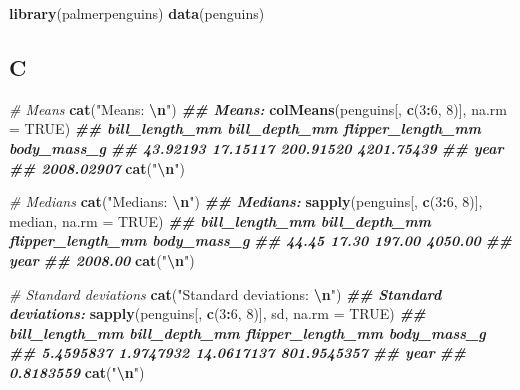 \documentclass[
]{article}
\newenvironment{Shaded}{\begin{snugshade}}{\end{snugshade}}
\newcommand{\AttributeTok}[1]{\textcolor[rgb]{0.13,0.29,0.53}{#1}}
\newcommand{\CommentTok}[1]{\textcolor[rgb]{0.56,0.35,0.01}{\textit{#1}}}
\newcommand{\ConstantTok}[1]{\textcolor[rgb]{0.56,0.35,0.01}{#1}}
\newcommand{\DecValTok}[1]{\textcolor[rgb]{0.00,0.00,0.81}{#1}}
\newcommand{\DocumentationTok}[1]{\textcolor[rgb]{0.56,0.35,0.01}{\textbf{\textit{#1}}}}
\newcommand{\FunctionTok}[1]{\textcolor[rgb]{0.13,0.29,0.53}{\textbf{#1}}}
\newcommand{\NormalTok}[1]{#1}
\newcommand{\SpecialCharTok}[1]{\textcolor[rgb]{0.81,0.36,0.00}{\textbf{#1}}}
\newcommand{\StringTok}[1]{\textcolor[rgb]{0.31,0.60,0.02}{#1}}
\begin{document}
\begin{Shaded}
\begin{Highlighting}[]
\FunctionTok{library}\NormalTok{(palmerpenguins)}
\FunctionTok{data}\NormalTok{(penguins)}
\end{Highlighting}
\end{Shaded}

\hypertarget{c}{%
\subsection{C}\label{c}}

\begin{Shaded}
\begin{Highlighting}[]
\CommentTok{\# Means}
\FunctionTok{cat}\NormalTok{(}\StringTok{"Means: }\SpecialCharTok{\textbackslash{}n}\StringTok{"}\NormalTok{)}
\DocumentationTok{\#\# Means:}
\FunctionTok{colMeans}\NormalTok{(penguins[, }\FunctionTok{c}\NormalTok{(}\DecValTok{3}\SpecialCharTok{:}\DecValTok{6}\NormalTok{, }\DecValTok{8}\NormalTok{)], }\AttributeTok{na.rm =} \ConstantTok{TRUE}\NormalTok{)}
\DocumentationTok{\#\#    bill\_length\_mm     bill\_depth\_mm flipper\_length\_mm       body\_mass\_g }
\DocumentationTok{\#\#          43.92193          17.15117         200.91520        4201.75439 }
\DocumentationTok{\#\#              year }
\DocumentationTok{\#\#        2008.02907}
\FunctionTok{cat}\NormalTok{(}\StringTok{"}\SpecialCharTok{\textbackslash{}n}\StringTok{"}\NormalTok{)}

\CommentTok{\# Medians}
\FunctionTok{cat}\NormalTok{(}\StringTok{"Medians: }\SpecialCharTok{\textbackslash{}n}\StringTok{"}\NormalTok{)}
\DocumentationTok{\#\# Medians:}
\FunctionTok{sapply}\NormalTok{(penguins[, }\FunctionTok{c}\NormalTok{(}\DecValTok{3}\SpecialCharTok{:}\DecValTok{6}\NormalTok{, }\DecValTok{8}\NormalTok{)], median, }\AttributeTok{na.rm =} \ConstantTok{TRUE}\NormalTok{)}
\DocumentationTok{\#\#    bill\_length\_mm     bill\_depth\_mm flipper\_length\_mm       body\_mass\_g }
\DocumentationTok{\#\#             44.45             17.30            197.00           4050.00 }
\DocumentationTok{\#\#              year }
\DocumentationTok{\#\#           2008.00}
\FunctionTok{cat}\NormalTok{(}\StringTok{"}\SpecialCharTok{\textbackslash{}n}\StringTok{"}\NormalTok{)}

\CommentTok{\# Standard deviations}
\FunctionTok{cat}\NormalTok{(}\StringTok{"Standard deviations: }\SpecialCharTok{\textbackslash{}n}\StringTok{"}\NormalTok{)}
\DocumentationTok{\#\# Standard deviations:}
\FunctionTok{sapply}\NormalTok{(penguins[, }\FunctionTok{c}\NormalTok{(}\DecValTok{3}\SpecialCharTok{:}\DecValTok{6}\NormalTok{, }\DecValTok{8}\NormalTok{)], sd, }\AttributeTok{na.rm =} \ConstantTok{TRUE}\NormalTok{)}
\DocumentationTok{\#\#    bill\_length\_mm     bill\_depth\_mm flipper\_length\_mm       body\_mass\_g }
\DocumentationTok{\#\#         5.4595837         1.9747932        14.0617137       801.9545357 }
\DocumentationTok{\#\#              year }
\DocumentationTok{\#\#         0.8183559}
\FunctionTok{cat}\NormalTok{(}\StringTok{"}\SpecialCharTok{\textbackslash{}n}\StringTok{"}\NormalTok{)}
\end{Highlighting}
\end{Shaded}
\end{document}
